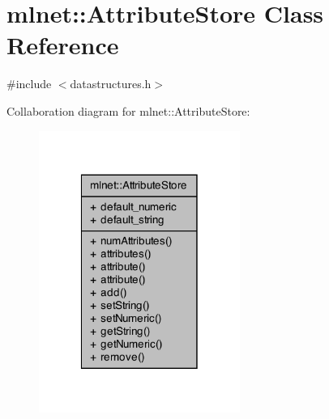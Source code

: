 \hypertarget{classmlnet_1_1_attribute_store}{\section{mlnet\+:\+:Attribute\+Store Class Reference}
\label{classmlnet_1_1_attribute_store}
}


{\ttfamily \#include $<$datastructures.\+h$>$}



Collaboration diagram for mlnet\+:\+:Attribute\+Store\+:\nopagebreak
\begin{figure}[H]
\begin{center}
\leavevmode
\includegraphics[width=186pt]{classmlnet_1_1_attribute_store__coll__graph}
\end{center}
\end{figure}
